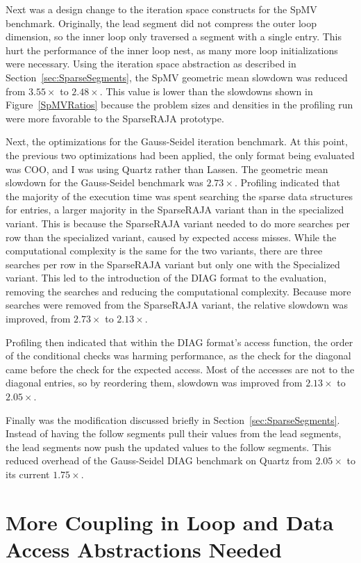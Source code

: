 Next was a design change to the iteration space constructs for the SpMV benchmark.
Originally, the lead segment did not compress the outer loop dimension, so the inner loop only traversed a segment with a single entry.
This hurt the performance of the inner loop nest, as many more loop initializations were necessary.
Using the iteration space abstraction as described in Section~\ref{sec:SparseSegments}, the SpMV geometric mean slowdown was reduced from $3.55\times$ to $2.48\times$.
This value is lower than the slowdowns shown in Figure~\ref{SpMVRatios} because the problem sizes and densities in the profiling run were more favorable to the SparseRAJA prototype.

Next, the optimizations for the Gauss-Seidel iteration benchmark.
At this point, the previous two optimizations had been applied, the only format being evaluated was COO\@, and I was using Quartz rather than Lassen.
The geometric mean slowdown for the Gauss-Seidel benchmark was $2.73\times$.
Profiling indicated that the majority of the execution time was spent searching the sparse data structures for entries, a larger majority in the SparseRAJA variant than in the specialized variant.
This is because the SparseRAJA variant needed to do more searches per row than the specialized variant, caused by expected access misses.
While the computational complexity is the same for the two variants, there are three searches per row in the SparseRAJA variant but only one with the Specialized variant.
This led to the introduction of the DIAG format to the evaluation, removing the searches and reducing the computational complexity. 
Because more searches were removed from the SparseRAJA variant, the relative slowdown was improved, from $2.73\times$ to $2.13\times$.

Profiling then indicated that within the DIAG format's access function, the order of the conditional checks was harming performance, as the check for the diagonal came before the check for the expected access.
Most of the accesses are not to the diagonal entries, so by reordering them, slowdown was improved from $2.13\times$ to $2.05\times$.

Finally was the modification discussed briefly in Section~\ref{sec:SparseSegments}.
Instead of having the follow segments pull their values from the lead segments, the lead segments now push the updated values to the follow segments.
This reduced overhead of the Gauss-Seidel DIAG benchmark on Quartz from $2.05\times$ to its current $1.75\times$.

\section{More Coupling in Loop and Data Access Abstractions Needed}\label{sec:SparseDiscussion}

